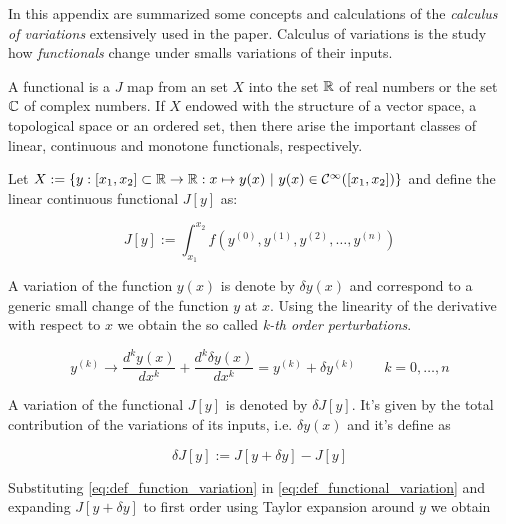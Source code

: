 In this appendix are summarized some concepts and calculations of the
\emph{calculus of variations} extensively used in the paper. Calculus of
variations is the study how \emph{functionals} change under smalls variations of
their inputs.


\begin{definition}
  \cite{Functional_Encyclopedia_of_Mathematics}
  A functional is a $J$ map from an set $X$ into the set $\operatorname{\mathbb{R}}$ of real numbers or
  the set $\operatorname{\mathbb{C}}$ of complex numbers. If $X$ endowed with the structure of a vector
  space, a topological space or an ordered set, then there arise the important
  classes of linear, continuous and monotone functionals, respectively.
\end{definition}

Let $X:=\{y: [x_1, x_2] \subset \operatorname{\mathbb{R}} \rightarrow \operatorname{\mathbb{R}}: x \mapsto y(x) \ | \ y(x)
\in \mathcal{C}^{\infty}([x_1, x_2])\}$ and define the linear continuous
functional $J[y]$ as:

\begin{equation} \label{eq:def_functional}
  J[y] := \int_{x_1}^{x_2} f(y^{(0)}, y^{(1)}, y^{(2)}, \ldots, y^{(n)})
\end{equation}

A variation of the function $y(x)$ is denote by $\delta y(x)$ and correspond to
a generic small change of the function $y$ at $x$. Using the linearity of the
derivative with respect to $x$ we obtain the so called \emph{k-th order
perturbations}.

\begin{equation} \label{eq:def_function_variation}
  y^{(k)} \rightarrow \frac{d^ky(x)}{dx^k} + \frac{d^k\delta y(x)}{dx^k} =
  y^{(k)} + \delta y^{(k)} \qquad k=0, \ldots, n
\end{equation}

A variation of the functional $J[y]$ is denoted by $\delta J[y]$. It's given by
the total contribution of the variations of its inputs, i.e. $\delta y(x)$ and
it's define as

\begin{equation} \label{eq:def_functional_variation}
  \delta J[y] := J[y + \delta y] - J[y]
\end{equation}

Substituting \eqref{eq:def_function_variation} in
\eqref{eq:def_functional_variation} and expanding $J[y + \delta y]$ to first
order using Taylor expansion around $y$ we obtain

